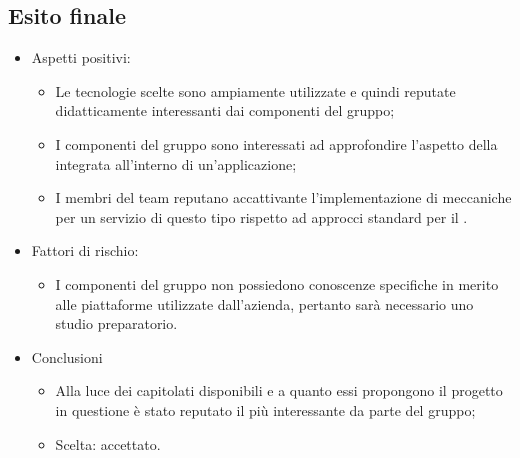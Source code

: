 \subsection{Esito finale}
    \begin{itemize}
        \item Aspetti positivi:
            \begin{itemize}
                \item Le tecnologie scelte sono ampiamente utilizzate e quindi reputate didatticamente interessanti dai componenti del gruppo;
                \item I componenti del gruppo sono interessati ad approfondire l'aspetto della  integrata all'interno di un'applicazione;
                \item I membri del team reputano accattivante l'implementazione di meccaniche  per un servizio di questo tipo rispetto ad approcci standard per il . 
            \end{itemize}
        \item Fattori di rischio:
            \begin{itemize}
                \item I componenti del gruppo non possiedono conoscenze specifiche in merito alle piattaforme utilizzate dall'azienda, pertanto sarà necessario uno studio preparatorio. 
            \end{itemize}
        \item Conclusioni
            \begin{itemize}
                \item Alla luce dei capitolati disponibili e a quanto essi propongono il progetto in questione è stato reputato il più interessante da parte del gruppo;
		        \item Scelta: accettato.
            \end{itemize}
    \end{itemize}